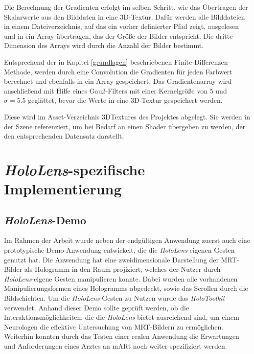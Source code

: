 Die Berechnung der Gradienten erfolgt im selben Schritt, wie das Übertragen der Skalarwerte aus den Bilddaten in eine 3D-Textur.
Dafür werden alle Bilddateien in einem Dateiverzeichnis, auf das ein vorher definierter Pfad zeigt, ausgelesen und in ein Array übertragen, das der Größe der Bilder entspricht. Die dritte Dimension des Arrays wird durch die Anzahl der Bilder bestimmt. 

Entsprechend der in Kapitel \ref{grundlagen} beschriebenen Finite-Differenzen-Methode, werden durch eine Convolution die Gradienten für jeden Farbwert berechnet und ebenfalls in ein Array gespeichert.
Das Gradientenarray wird anschließend mit Hilfe eines Gauß-Filters mit einer Kernelgröße von 5 und $\sigma=5.5$ geglättet, bevor die Werte in eine 3D-Textur gespeichert werden. 

Diese wird im Asset-Verzeichnis 3DTextures des Projektes abgelegt. Sie werden in der Szene referenziert, um bei Bedarf an einen Shader übergeben zu werden, der den entsprechenden Datensatz darstellt. 

\section{\textit{HoloLens}-spezifische Implementierung}
\label{plattformen}

\subsection{\textit{HoloLens}-Demo}
Im Rahmen der Arbeit wurde neben der endgültigen Anwendung zuerst auch eine prototypische Demo-Anwendung entwickelt, die die \textit{HoloLens}-eigenen Gesten genutzt hat. Die Anwendung hat eine zweidimensionale Darstellung der MRT-Bilder als Hologramm in den Raum projiziert, welches der Nutzer durch \textit{HoloLens}-eigene Gesten manipulieren konnte. Dabei wurden alle vorhandenen Manipulierungsformen eines Hologramms abgedeckt, sowie das Scrollen durch die Bildschichten. Um die \textit{HoloLens}-Gesten zu Nutzen wurde das \textit{HoloToolkit} verwendet. 
Anhand dieser Demo sollte geprüft werden, ob die Interaktionsmöglichkeiten, die die \textit{HoloLens} bietet ausreichend sind, um einem Neurologen die effektive Untersuchung von MRT-Bildern zu ermöglichen.
Weiterhin konnten durch das Testen einer realen Anwendung die Erwartungen und Anforderungen eines Arztes an mARt noch weiter spezifiziert werden.  

